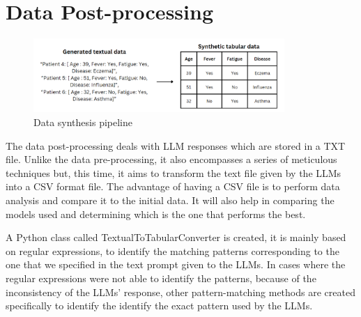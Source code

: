 




\section{Data Post-processing}

\begin{figure}[H]
    \centering
    \includegraphics[width=0.85\textwidth]{images/textTotabular.png}
    \caption{Data synthesis pipeline}
    \label{fig:pipeline}
\end{figure}

The data post-processing deals with LLM responses which are stored in a TXT file. Unlike the data pre-processing, it also encompasses a series of meticulous techniques but, this time, it aims to transform the text file given by the LLMs into a CSV format file. The advantage of having a CSV file is to perform data analysis and compare it to the initial data. It will also help in comparing the models used and determining which is the one that performs the best. 

A Python class called TextualToTabularConverter is created, it is mainly based on regular expressions, to identify the matching patterns corresponding to the one that we specified in the text prompt given to the LLMs.
In cases where the regular expressions were not able to identify the patterns, because of the inconsistency of the LLMs' response, other pattern-matching methods are created specifically to identify the identify the exact pattern used by the LLMs.

